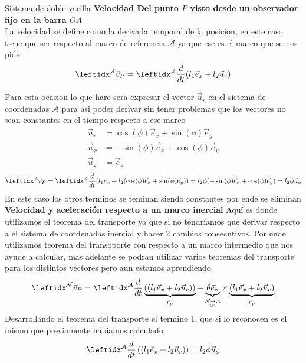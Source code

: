 \begin{solucion}{Sistema de doble varilla}
\textbf{Velocidad Del punto $P$ visto desde un observador fijo en la barra $OA$}\\
La velocidad se define como la derivada temporal de la posicion, en este caso tiene que ser respecto al marco de referencia $\mathcal{A}$ ya que ese es el marco que se nos pide
\begin{equation*}
            \marc{}{A}\vec{v}_P=\der{}{A}{(l_1\vec{e}_x+l_2\vec{u}_r)} 
        \end{equation*}


        Para esta ocasion lo que hare sera expresar el vector $\vec{u}_r$ en el sistema de coordenadas $\mathcal{A}$ para asi poder derivar sin tener problemas que los vectores no sean constantes en el tiempo respecto a ese marco
        \begin{equation*}
\begin{split}
    \vec{u}_r&=\cos(\phi)\vec{e}_x+\sin(\phi)\vec{e}_y\\
    \vec{u}_\phi&=-\sin(\phi)\vec{e}_x+\cos(\phi)\vec{e}_y\\
    \vec{u}_z&=\vec{e}_z
\end{split}
\end{equation*}
\begin{equation*}
            \marc{}{A}\vec{v}_P=\der{}{A}{(l_1\vec{e}_x+l_2(\cos(\phi)\vec{e}_x+\sin(\phi)\vec{e}_y))}=l_2\dot\phi(-\sin(\phi)\vec{e}_x+\cos(\phi)\vec{e}_y) =l_2\dot\phi\vec{u}_\phi
\end{equation*}
En este caso los otros terminos se teminan siendo constantes por ende se eliminan\\
        \textbf{Velocidad y aceleración respecto a un marco inercial}
        Aquí es donde utilizamos el teorema del transporte ya que si no tendríamos que derivar respecto a el sistema de coordenadas inercial y hacer 2 cambios consecutivos. Por ende utilizamos teorema del transoporte con respecto a un marco intermedio que nos ayude a calcular, mas adelante se podran utilizar varios teoremas del transporte para los distintos vectores pero aun estamos aprendiendo.
        \begin{equation*}
            \marc{}{N}\vec{v}_P=\transD{(l_1\vec{e}_x+l_2\vec{u}_r)}{\dot\theta\vec{e}_z}{N}{A}{\vec{r}_p}
        \end{equation*}
        Desarrollando el teorema del transporte el termino 1, que si lo reconocen es el mismo que previamente habiamos calculado
        \begin{align}
            \der{}{A}\left((l_1\vec{e}_x+l_2\vec{u}_r)\right)=l_2\dot\phi\vec{u}_\phi

\end{align}
\end{solucion}
